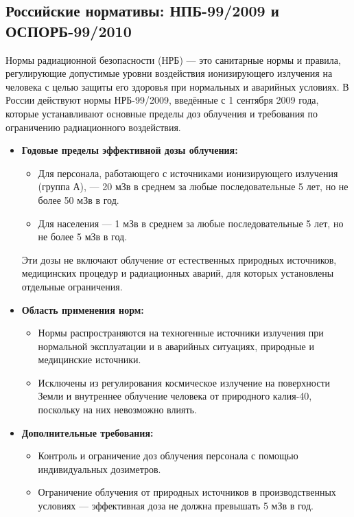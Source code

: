 \documentclass[a4paper, 14pt]{extarticle}
\begin{document}
\subsection{Российские нормативы: НПБ-99/2009 и ОСПОРБ-99/2010}

Нормы радиационной безопасности (НРБ) --- это санитарные нормы и правила, регулирующие допустимые уровни воздействия ионизирующего излучения на человека с целью защиты его здоровья при нормальных и аварийных условиях. В России действуют нормы НРБ-99/2009, введённые с 1 сентября 2009 года, которые устанавливают основные пределы доз облучения и требования по ограничению радиационного воздействия.

\begin{itemize}
    \item \textbf{Годовые пределы эффективной дозы облучения:}
          \begin{itemize}
              \item Для персонала, работающего с источниками ионизирующего излучения (группа А), --- 20 мЗв в среднем за любые последовательные 5 лет, но не более 50 мЗв в год.
              \item Для населения --- 1 мЗв в среднем за любые последовательные 5 лет, но не более 5 мЗв в год.
          \end{itemize}
          Эти дозы не включают облучение от естественных природных источников, медицинских процедур и радиационных аварий, для которых установлены отдельные ограничения.

    \item \textbf{Область применения норм:}
          \begin{itemize}
              \item Нормы распространяются на техногенные источники излучения при нормальной эксплуатации и в аварийных ситуациях, природные и медицинские источники.
              \item Исключены из регулирования космическое излучение на поверхности Земли и внутреннее облучение человека от природного калия-40, поскольку на них невозможно влиять.
          \end{itemize}

    \item \textbf{Дополнительные требования:}
          \begin{itemize}
              \item Контроль и ограничение доз облучения персонала с помощью индивидуальных дозиметров.
              \item Ограничение облучения от природных источников в производственных условиях --- эффективная доза не должна превышать 5 мЗв в год.
          \end{itemize}


\end{itemize}
\end{document}
